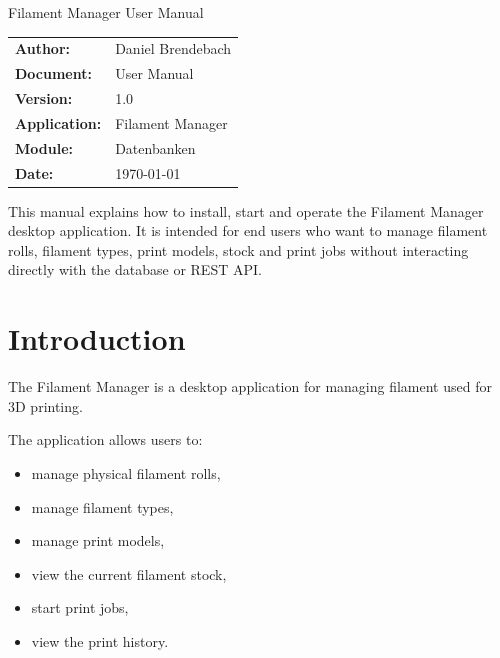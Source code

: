 \documentclass[a4paper,11pt]{article}
\begin{document}


\thispagestyle{empty}

\thgaTitel
  {Filament Manager}
  {User Manual}

\vspace{0.8cm}

\begin{tabularx}{\linewidth}{@{}lX@{}}
\textbf{Author:}      & Daniel Brendebach \\
\textbf{Document:}    & User Manual \\
\textbf{Version:}     & 1.0 \\
\textbf{Application:} & Filament Manager \\
\textbf{Module:}      & Datenbanken \\
\textbf{Date:}        & \today \\
\end{tabularx}

\vfill

\begin{infobox}
This manual explains how to install, start and operate the Filament Manager
desktop application. It is intended for end users who want to manage filament
rolls, filament types, print models, stock and print jobs without interacting
directly with the database or REST API.
\end{infobox}

\newpage


\tableofcontents

\newpage

\section{Introduction}

The Filament Manager is a desktop application for managing filament used for
3D printing.

The application allows users to:

\begin{itemize}
  \item manage physical filament rolls,
  \item manage filament types,
  \item manage print models,
  \item view the current filament stock,
  \item start print jobs,
  \item view the print history.
\end{itemize}
\end{document}
